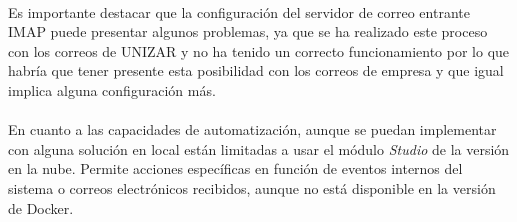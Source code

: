 \paragraph{}
Es importante destacar que la configuración del servidor de correo entrante IMAP puede presentar algunos problemas, ya que se ha realizado este proceso con los correos de UNIZAR y no ha tenido un correcto funcionamiento por lo que habría que tener presente esta posibilidad con los correos de empresa y que igual implica alguna configuración más.
\paragraph{}
En cuanto a las capacidades de automatización, aunque se puedan implementar con alguna solución en local están limitadas a usar el módulo \textit{Studio} de la versión en la nube. Permite acciones específicas en función de eventos internos del sistema o correos electrónicos recibidos, aunque no está disponible en la versión de Docker.








